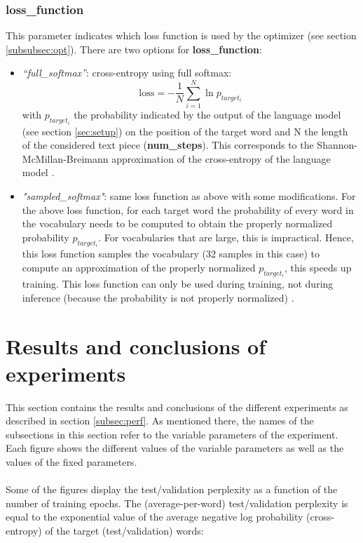 \documentclass[10pt,a4paper,titlepage]{article}
\begin{document}
\subsubsection{loss\_function}
\label{subsubsec:loss}

This parameter indicates which loss function is used by the optimizer (see section \ref{subsubsec:opt}). There are two options for \textbf{loss\_function}:

\begin{itemize}
	
	\item \textit{``full\_softmax''}: cross-entropy using full softmax:
	\[ \text{loss} = -\frac{1}{N} \sum_{i=1}^{N} \ln p_{target_{i}} \]
	\noindent
	with $p_{target_{i}}$ the probability indicated by the output of the language model (see section \ref{sec:setup}) on the position of the target word and N the length of the considered text piece (\textbf{num\_steps}). This corresponds to the Shannon-McMillan-Breimann approximation of the cross-entropy of the language model \cite{cross}.
	
	\item \textit{"sampled\_softmax"}: same loss function as above with some modifications. For the above loss function, for each target word the probability of every word in the vocabulary needs to be computed to obtain  the properly normalized probability $p_{target_{i}}$. For vocabularies that are large, this is impractical. Hence, this loss function samples the vocabulary (32 samples in this case) to compute an approximation of the properly normalized $p_{target_{i}}$, this speeds up training. This loss function can only be used during training, not during inference (because the probability is not properly normalized) \cite{sampled}.
	
\end{itemize}

\newpage
\section{Results and conclusions of experiments}
\label{sec:results}

This section contains the results and conclusions of the different experiments as described in section \ref{subsec:perf}. As mentioned there, the names of the subsections in this section refer to the variable parameters of the experiment. Each figure shows the different values of the variable parameters as well as the values of the fixed parameters.\\
\\
Some of the figures display the test/validation perplexity as a function of the number of training epochs. The (average-per-word) test/validation perplexity is equal to the exponential value of the average negative log probability (cross-entropy) of the target (test/validation) words:
\end{document}
